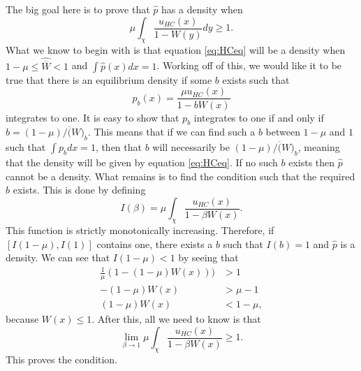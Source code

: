 The big goal here is to prove that $\hat{p}$ has a density when 
\begin{equation}
\mu \int_{\chi}\frac{u_{HC}(x)}{1-W(y)}dy \geq 1.
\end{equation}
What we know to begin with is that equation \ref{eq:HCeq} will be a density when $1-\mu \leq \hat{\overline{W}} < 1$ and 
$\int \hat{p}(x)dx = 1$. Working off of this, we would like it to be true that there is an equilibrium density if some $b$ 
exists such that 
\begin{equation}
p_b(x) = \frac{\mu u_{HC}(x)}{1-bW(x)}
\end{equation}
integrates to one. It is easy to show that $p_b$ integrates to one if and only if $b=(1-\mu)/\overline(W)_b$. This means
that if we can find such a $b$ between $1-\mu$ and $1$ such that $\int p_b dx=1$, then that $b$ will necessarily be
$(1-\mu)/\overline(W)_b$, meaning that the density will be given by equation \ref{eq:HCeq}. If no such $b$ exists then
$\hat{p}$ cannot be a density. What remains is to find the condition such that the required $b$ exists. This is done by 
defining 
\begin{equation}
I(\beta) = \mu \int_{\chi}\frac{u_{HC}(x)}{1-\beta W(x)}.
\end{equation}
This function is strictly monotonically increasing. Therefore, if $[I(1-\mu),I(1)]$ contains one, there exists a $b$ such 
that $I(b)=1$ and $\hat{p}$ is a density. We can see that $I(1-\mu)<1$ by seeing that 
\begin{align}
\frac{1}{\mu}(1-(1-\mu)W(x))) &> 1 \nonumber \\
-(1-\mu)W(x) &> \mu - 1 \nonumber \\
(1-\mu)W(x) &< 1-\mu, 
\end{align}
because $W(x) \leq 1$. After this, all we need to know is that 
\begin{equation}
\lim_{\beta \to 1} \mu \int_{\chi}\frac{u_{HC}(x)}{1-\beta W(x)} \geq 1.
\end{equation}
This proves the condition. 
